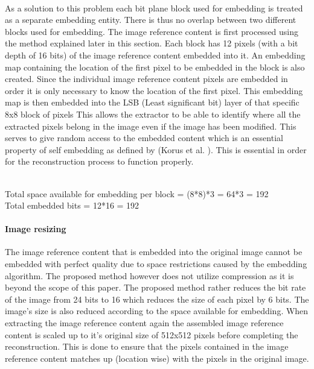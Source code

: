\documentclass[12pt]{article}
\begin{document}
\hspace{0pt} \\
As a solution to this problem each bit plane block used for embedding is treated as a separate embedding entity.
There is thus no overlap between two different blocks used for embedding.
The image reference content is first processed using the method explained later in this section.
Each block has 12 pixels (with a bit depth of 16 bits) of the image reference content embedded into it.
An embedding map containing the location of the first pixel to be embedded in the block is also created.
Since the individual image reference content pixels are embedded in order it is only necessary to know the location of the first pixel.
This embedding map is then embedded into the LSB (Least significant bit) layer of that specific 8x8 block of pixels 
This allows the extractor to be able to identify where all the extracted pixels belong in the image even if the image has been modified.
This serves to give random access to the embedded content which is an essential property of self embedding as defined by (Korus et al. \cite{korus2013efficient}).
This is essential in order for the reconstruction process to function properly.

\hspace{0pt} \\
Total space available for embedding per block = (8*8)*3 = 64*3 = 192
\hspace{0pt} \\
Total embedded bits = 12*16 = 192

\paragraph{Image resizing}
\label{ImageCompression}
The image reference content that is embedded into the original image cannot be embedded with perfect quality due to space restrictions caused by the embedding algorithm. 
The proposed method however does not utilize compression as it is beyond the scope of this paper.
The proposed method rather reduces the bit rate of the image from 24 bits to 16 which reduces the size of each pixel by 6 bits.
The image's size is also reduced according to the space available for embedding.
When extracting the image reference content again the assembled image reference content is scaled up to it's original size of 512x512 pixels before completing the reconstruction.
This is done to ensure that the pixels contained in the image reference content matches up (location wise) with the pixels in the original image.
\end{document}
